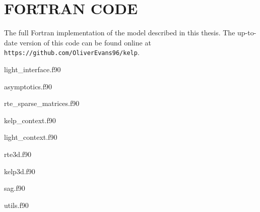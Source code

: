 \chapter{FORTRAN CODE}
\label{chap:fortran}

The full Fortran implementation of the model described in this thesis.
The up-to-date version of this code can be found online at
\texttt{https://github.com/OliverEvans96/kelp}.

light\_interface.f90


asymptotics.f90


rte\_sparse\_matrices.f90


kelp\_context.f90


light\_context.f90


rte3d.f90


kelp3d.f90


sag.f90


utils.f90


